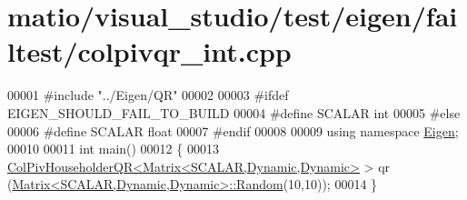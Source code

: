 \hypertarget{matio_2visual__studio_2test_2eigen_2failtest_2colpivqr__int_8cpp_source}{}\section{matio/visual\+\_\+studio/test/eigen/failtest/colpivqr\+\_\+int.cpp}
\label{matio_2visual__studio_2test_2eigen_2failtest_2colpivqr__int_8cpp_source}

\begin{DoxyCode}
00001 \textcolor{preprocessor}{#include "../Eigen/QR"}
00002 
00003 \textcolor{preprocessor}{#ifdef EIGEN\_SHOULD\_FAIL\_TO\_BUILD}
00004 \textcolor{preprocessor}{#define SCALAR int}
00005 \textcolor{preprocessor}{#else}
00006 \textcolor{preprocessor}{#define SCALAR float}
00007 \textcolor{preprocessor}{#endif}
00008 
00009 \textcolor{keyword}{using namespace }\hyperlink{namespace_eigen}{Eigen};
00010 
00011 \textcolor{keywordtype}{int} main()
00012 \{
00013   \hyperlink{group___q_r___module_class_eigen_1_1_col_piv_householder_q_r}{ColPivHouseholderQR<Matrix<SCALAR,Dynamic,Dynamic>} > qr
      (\hyperlink{group___core___module_class_eigen_1_1_matrix}{Matrix<SCALAR,Dynamic,Dynamic>::Random}(10,10));
00014 \}
\end{DoxyCode}

